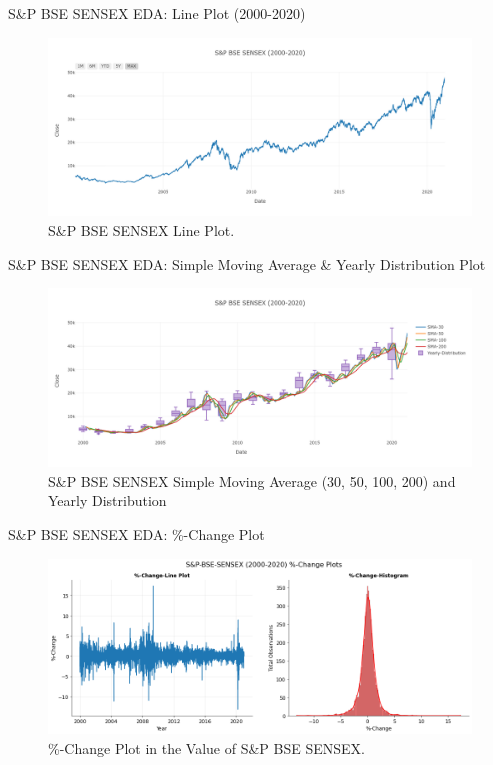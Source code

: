 \documentclass{beamer}
\begin{document}
\begin{frame}{S\&P BSE SENSEX EDA: Line Plot (2000-2020)}
	\begin{figure}
		\centering
		\includegraphics[width = \textwidth]{SENSEX 2000-2020 Line Plot-1}
		\caption{S\&P BSE SENSEX Line Plot.}
		\label{fig:my_label}
	\end{figure}
\end{frame}
\begin{frame}{S\&P BSE SENSEX EDA: Simple Moving Average \& Yearly Distribution Plot}
	\begin{figure}
		\centering
		\includegraphics[width = \textwidth]{images/SENSEX 2000-2020 Line Plot-2}
		\caption{S\&P BSE SENSEX Simple Moving Average (30, 50, 100, 200) and Yearly Distribution}
		\label{fig:my_label}
	\end{figure}
\end{frame}

\begin{frame}{S\&P BSE SENSEX EDA: \%-Change Plot}
	\begin{figure}
		\centering
		\includegraphics[width = \textwidth]{images/SENSEX 2000-2020 Change Plot}
		\caption{\%-Change Plot in the Value of S\&P BSE SENSEX.}
		\label{fig:my_label}
	\end{figure}
\end{frame}
\end{document}
